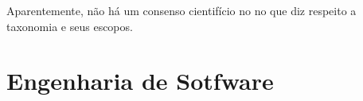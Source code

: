 Aparentemente, não há um consenso cientifício no no que diz respeito a taxonomia e seus escopos. 






\section{Engenharia de Sotfware}\label{sec:Engenharia}


